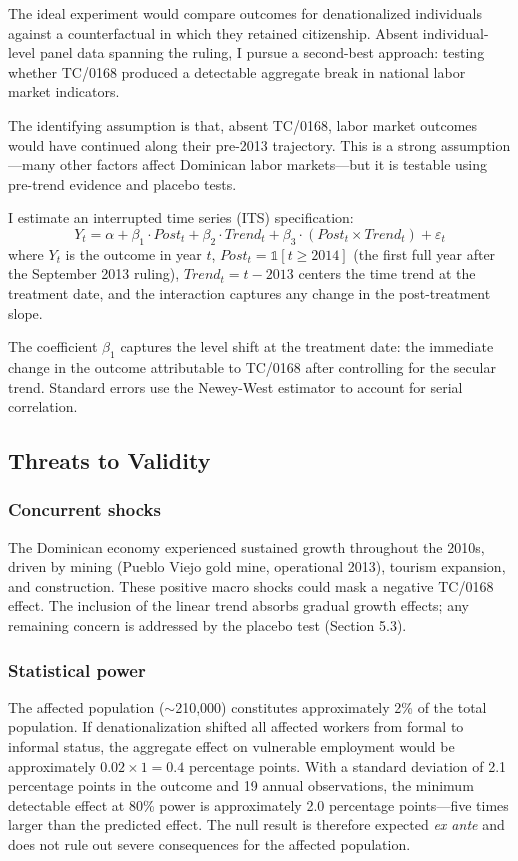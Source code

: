 \documentclass[12pt]{article}
\begin{document}
The ideal experiment would compare outcomes for denationalized individuals against a counterfactual in which they retained citizenship. Absent individual-level panel data spanning the ruling, I pursue a second-best approach: testing whether TC/0168 produced a detectable aggregate break in national labor market indicators.

The identifying assumption is that, absent TC/0168, labor market outcomes would have continued along their pre-2013 trajectory. This is a strong assumption---many other factors affect Dominican labor markets---but it is testable using pre-trend evidence and placebo tests.

I estimate an interrupted time series (ITS) specification:
\begin{equation}
Y_t = \alpha + \beta_1 \cdot \textit{Post}_t + \beta_2 \cdot \textit{Trend}_t + \beta_3 \cdot (\textit{Post}_t \times \textit{Trend}_t) + \varepsilon_t
\label{eq:its}
\end{equation}
where $Y_t$ is the outcome in year $t$, $\textit{Post}_t = \mathbb{1}[t \geq 2014]$ (the first full year after the September 2013 ruling), $\textit{Trend}_t = t - 2013$ centers the time trend at the treatment date, and the interaction captures any change in the post-treatment slope.

The coefficient $\beta_1$ captures the level shift at the treatment date: the immediate change in the outcome attributable to TC/0168 after controlling for the secular trend. Standard errors use the Newey-West estimator to account for serial correlation.

\subsection{Threats to Validity}

\subsubsection*{Concurrent shocks}
The Dominican economy experienced sustained growth throughout the 2010s, driven by mining (Pueblo Viejo gold mine, operational 2013), tourism expansion, and construction. These positive macro shocks could mask a negative TC/0168 effect. The inclusion of the linear trend absorbs gradual growth effects; any remaining concern is addressed by the placebo test (Section 5.3).

\subsubsection*{Statistical power}
The affected population ($\sim$210,000) constitutes approximately 2\% of the total population. If denationalization shifted all affected workers from formal to informal status, the aggregate effect on vulnerable employment would be approximately $0.02 \times 1 = 0.4$ percentage points. With a standard deviation of 2.1 percentage points in the outcome and 19 annual observations, the minimum detectable effect at 80\% power is approximately 2.0 percentage points---five times larger than the predicted effect. The null result is therefore expected \textit{ex ante} and does not rule out severe consequences for the affected population.
\end{document}
